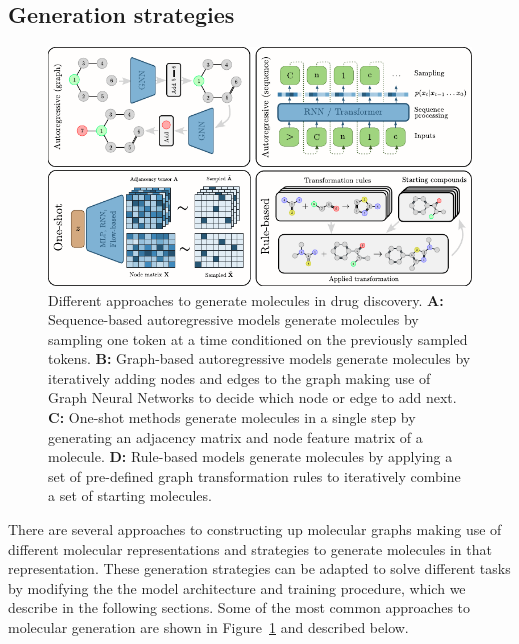 \subsection{Generation strategies}
\begin{figure}
      \centering
      \includegraphics[width=\textwidth]{figures/generation_strategies_tryout.pdf}
      \caption{Different approaches to generate molecules in drug discovery. \textbf{A:}
            Sequence-based autoregressive models generate molecules by sampling one token at a time
            conditioned on the previously sampled tokens. \textbf{B:} Graph-based autoregressive models
            generate molecules by iteratively adding nodes and edges to the graph making use of Graph
            Neural Networks to decide which node or edge to add next. \textbf{C:} One-shot methods
            generate molecules in a single step by generating an adjacency matrix and node feature matrix
            of a molecule. \textbf{D:} Rule-based models generate molecules by applying a set of
            pre-defined graph transformation rules to iteratively combine a set of starting molecules.
            \label{fig:generation-strategies}}
\end{figure}
There are several approaches to constructing up molecular graphs making use of different molecular
representations and strategies to generate molecules in that representation. These generation
strategies can be adapted to solve different tasks by modifying the the model architecture and
training procedure, which we describe in the following sections. Some of the most common approaches
to molecular generation  are shown in Figure~\ref{fig:generation-strategies} and described below.

